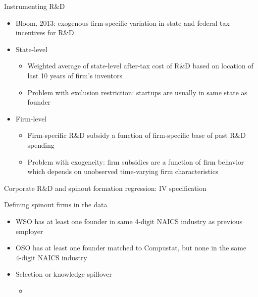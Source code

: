 \documentclass[english,usenames,dvipsnames]{beamer}
\begin{document}
\begin{frame}{Instrumenting R\&D}
\begin{itemize}
	\item Bloom, 2013: exogenous firm-specific variation in state and federal tax incentives for R\&D
	\item State-level
	\begin{itemize}
		\item Weighted average of state-level after-tax cost of R\&D based on location of last 10 years of firm's inventors
		\item Problem with exclusion restriction: startups are usually in same state as founder
	\end{itemize}
	\item Firm-level
	\begin{itemize}
		\item Firm-specific R\&D subsidy a function of firm-specific base of past R\&D spending
		\item Problem with exogeneity: firm subsidies are a function of firm behavior which depends on unobserved time-varying firm characteristics
	\end{itemize}
\end{itemize}
\end{frame}

\begin{frame}{Corporate R\&D and spinout formation regression: IV specification}
\begin{table}
\Tiny
\centering

\caption{\tiny The dependent variable is the log of the average yearly number of founders from the parent firm joining startups, over the years $t+1,t+2,t+3$. Independent variables are similarly averaged over $t,t-1,t-2$. Columns (1) and (5) are estimated by OLS. The remaining columns columns are estimated by instrumenting R\&D spending using firm-specific tax incentives for R\&D, from Bloom 2013. Standard errors are clustered at the firm level.}
\label{table:RDandSpinoutFormation_iv_founder2_l3f3}
\end{table}
\end{frame}

\begin{frame}{Defining spinout firms in the data}
\begin{itemize}	
	\item WSO has at least one founder in same 4-digit NAICS industry as previous employer
	\item OSO has at least one founder matched to Compustat, but none in the same 4-digit NAICS industry
	\item Selection or knowledge spillover
	\begin{itemize}
		\item 
	\end{itemize}
\end{itemize}
\end{frame}
\end{document}
